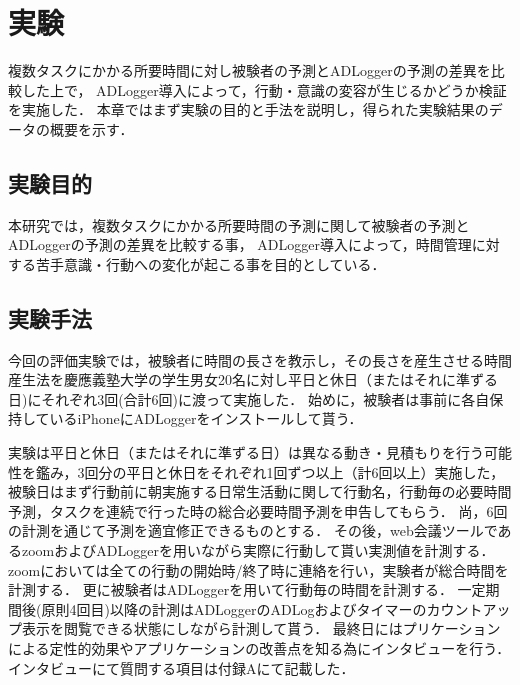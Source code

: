 \chapter{実験}
複数タスクにかかる所要時間に対し被験者の予測とADLoggerの予測の差異を比較した上で，
ADLogger導入によって，行動・意識の変容が生じるかどうか検証を実施した．
本章ではまず実験の目的と手法を説明し，得られた実験結果のデータの概要を示す．

\section{実験目的}
本研究では，複数タスクにかかる所要時間の予測に関して被験者の予測とADLoggerの予測の差異を比較する事，
ADLogger導入によって，時間管理に対する苦手意識・行動への変化が起こる事を目的としている．

\section{実験手法}
今回の評価実験では，被験者に時間の長さを教示し，その長さを産生させる時間産生法\cite{Oguro1961}\cite{Tayama2018}を慶應義塾大学の学生男女20名に対し平日と休日（またはそれに準ずる日)にそれぞれ3回(合計6回)に渡って実施した．
始めに，被験者は事前に各自保持しているiPhoneにADLoggerをインストールして貰う．

実験は平日と休日（またはそれに準ずる日）は異なる動き・見積もりを行う可能性を鑑み，3回分の平日と休日をそれぞれ1回ずつ以上（計6回以上）実施した，
被験日はまず行動前に朝実施する日常生活動に関して行動名，行動毎の必要時間予測，タスクを連続で行った時の総合必要時間予測を申告してもらう．
尚，6回の計測を通じて予測を適宜修正できるものとする．
その後，web会議ツールであるzoom\cite{zoom}およびADLoggerを用いながら実際に行動して貰い実測値を計測する．
zoomにおいては全ての行動の開始時/終了時に連絡を行い，実験者が総合時間を計測する．
更に被験者はADLoggerを用いて行動毎の時間を計測する．
一定期間後(原則4回目)以降の計測はADLoggerのADLogおよびタイマーのカウントアップ表示を閲覧できる状態にしながら計測して貰う．
最終日にはプリケーションによる定性的効果やアプリケーションの改善点を知る為にインタビューを行う．インタビューにて質問する項目は付録Aにて記載した．

